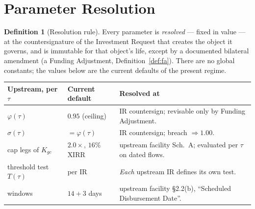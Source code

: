 \documentclass[11pt, a4paper]{article}
\theoremstyle{definition}
\newtheorem{definition}{Definition}[section]
\newcommand{\GCCIA}{upstream facility}
\newcommand{\Kgc}{K_{gc}}                         %
\begin{document}
\section{Parameter Resolution}\label{sec:params}

\begin{definition}[Resolution rule]\label{def:resolution}
Every parameter is \emph{resolved} --- fixed in value --- at the countersignature of the Investment Request that creates the object it governs, and is immutable for that object's life, except by a documented bilateral amendment (a Funding Adjustment, Definition~\ref{def:fa}). There are no global constants; the values below are the current defaults of the present regime.
\end{definition}

\begin{center}
\begin{tabular}{@{} L{3.4cm} C{2.8cm} L{7.6cm} @{}}
\toprule
\textbf{Upstream, per $\tau$} & \textbf{Current default} & \textbf{Resolved at} \\
\midrule
$\varphi(\tau)$ & $0.95$ (ceiling) & IR countersign; revisable only by Funding Adjustment. \\[3pt]
$\sigma(\tau)$ & $= \varphi(\tau)$ & IR countersign; breach $\Rightarrow 1.00$. \\[3pt]
cap legs of $\Kgc$ & $2.0\times$, $16\%$ XIRR & \GCCIA{} Sch.~A; evaluated per $\tau$ on dated flows. \\[3pt]
threshold test $T(\tau)$ & per IR & \emph{Each} upstream IR defines its own test. \\[3pt]
windows & $14 + 3$ days & \GCCIA{} \S2.2(b), ``Scheduled Disbursement Date''. \\
\bottomrule
\end{tabular}
\end{center}
\end{document}
